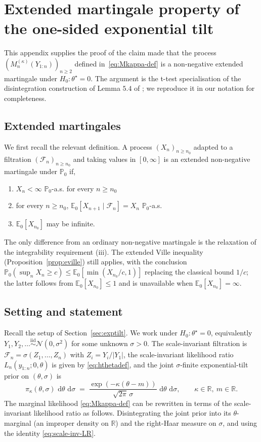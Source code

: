 \documentclass{article}%
\newcommand{\E}{\mathbb{E}}
\newcommand{\dd}{\,\mathrm{d}}
\newcommand{\1}{\mathbf{1}}
\begin{document}
\section{Extended martingale property of the one-sided exponential tilt}
\label{app:extended-mg}
This appendix supplies the proof of the claim made that the process \((M_n^{(\kappa)}(Y_{1:n}))_{n\geq 2}\) defined in~\eqref{eq:Mkappa-def} is a non-negative extended martingale under \(H_0:\theta^\star=0\). The
argument is the t-test specialisation of the disintegration construction of Lemma $5.4$ of \cite{Wang2025}; we reproduce it in our notation for completeness.

\subsection{Extended martingales}

We first recall the relevant definition. A process \((X_n)_{n\geq n_0}\)
adapted to a filtration \((\mathcal{F}_n)_{n\geq n_0}\) and taking values
in \([0,\infty]\) is an extended non-negative martingale under
\(\mathbb{P}_0\) if,
\begin{enumerate}
\item[(i)] \(X_n<\infty\) \(\mathbb{P}_0\)-a.s. for every \(n\geq n_0\)
\item[(ii)] for every \(n\geq n_0\),
\(\E_0[X_{n+1}\mid \mathcal{F}_n]=X_n\) \(\mathbb{P}_0\)-a.s.
\item[(iii)] \(\E_0[X_{n_0}]\) may be infinite.
\end{enumerate}
The only difference from an ordinary non-negative martingale is the
relaxation of the integrability requirement (iii). The extended Ville
inequality (Proposition~\ref{prop:eville}) still applies, with the conclusion \(\mathbb{P}_0(\sup_n X_n\geq c)\leq \E_0[\min(X_{n_0}/c,1)]\) replacing the classical bound \(1/c\); the latter follows from \(\E_0[X_{n_0}]\leq 1\) and is unavailable when \(\E_0[X_{n_0}]=\infty\).

\subsection{Setting and statement}

Recall the setup of Section~\ref{sec:exptilt}. We work under \(H_0:\theta^\star=0\),
equivalently \(Y_1,Y_2,\ldots\stackrel{\mathrm{iid}}{\sim}\mathcal{N}(0,\sigma^2)\)
for some unknown \(\sigma>0\). The scale-invariant filtration is
\(\mathcal{F}_n=\sigma(Z_1,\ldots,Z_n)\) with \(Z_i=Y_i/|Y_1|\), the
scale-invariant likelihood ratio \(L_n(y_{1:n};0,\theta)\) is given by
\eqref{eq:hthetadef}, and the joint \(\sigma\)-finite exponential-tilt prior on \((\theta,\sigma)\) is
\[
\pi_\kappa(\theta,\sigma)\,\dd\theta\,\dd\sigma
\;=\;\frac{\exp(-\kappa(\theta-m))}{\sqrt{2\pi}\,\sigma}\,
\dd\theta\,\dd\sigma,
\qquad \kappa\in\mathbb{R},\ m\in\mathbb{R}.
\]
The marginal likelihood \eqref{eq:Mkappa-def} can be rewritten in terms of the scale-invariant likelihood ratio as follows. Disintegrating the joint prior into its \(\theta\)-marginal (an improper density on \(\mathbb{R}\)) and the right-Haar measure on \(\sigma\), and using the identity \eqref{eq:scale-inv-LR}. 
\end{document}
